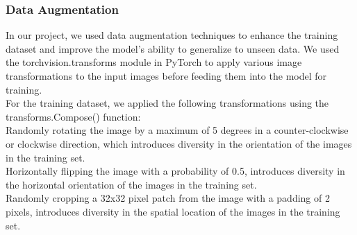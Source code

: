 \documentclass[letterpaper]{article} %
\begin{document}
\subsubsection{Data Augmentation}
In our project, we used data augmentation techniques to enhance the training dataset and improve the model's ability to generalize to unseen data. We used the torchvision.transforms module in PyTorch to apply various image transformations to the input images before feeding them into the model for training.\\
For the training dataset, we applied the following transformations using the transforms.Compose() function: \\
Randomly rotating the image by a maximum of 5 degrees in a counter-clockwise or clockwise direction, which introduces diversity in the orientation of the images in the training set. \\
Horizontally flipping the image with a probability of 0.5, introduces diversity in the horizontal orientation of the images in the training set. \\
Randomly cropping a 32x32 pixel patch from the image with a padding of 2 pixels, introduces diversity in the spatial location of the images in the training set. \\
\end{document}
